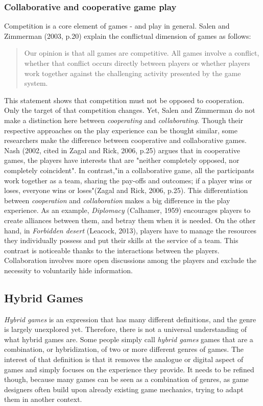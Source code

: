 \subsubsection{Collaborative and cooperative game play}
Competition is a core element of games - and play in general. Salen and Zimmerman (2003, p.20) explain the conflictual dimension of games as follows:
\begin{quotation}
Our opinion is that all games are competitive. All games involve a conflict, whether that conflict occurs directly between players or whether players work together against the challenging activity presented by the game system.
\end{quotation}
This statement shows that competition must not be opposed to cooperation. Only the target of that competition changes. Yet, Salen and Zimmerman do not make a distinction here between \textit{cooperating} and \textit{collaborating}. Though their respective approaches on the play experience can be thought similar, some researchers make the difference between cooperative and collaborative games. Nash (2002, cited in Zagal and Rick, 2006, p.25)\cite{art:collab} argues that in cooperative games, the players have interests that are "neither completely opposed, nor completely coincident". In contrast,"in a collaborative game, all the participants work together as a team, sharing the pay-offs and outcomes; if a player wins or loses, everyone wins or loses"(Zagal and Rick, 2006, p.25). This differentiation between \textit{cooperation} and \textit{collaboration} makes a big difference in the play experience. As an example, \textit{Diplomacy} (Calhamer, 1959)\cite{game:diplo} encourages players to create alliances between them, and betray them when it is needed. On the other hand, in \textit{Forbidden desert} (Leacock, 2013)\cite{game:desert}, players have to manage the resources they individually possess and put their skills at the service of a team. 
This contrast is noticeable thanks to the interactions between the players. Collaboration involves more open discussions among the players and exclude the necessity to voluntarily hide information.

\subsection{Hybrid Games}
\textit{Hybrid games} is an expression that has many different definitions, and the genre is largely unexplored yet. Therefore, there is not a universal understanding of what hybrid games are. Some people simply call \textit{hybrid games} games that are a combination, or hybridization, of two or more different genres of games. The interest of that definition is that it removes the analogue or digital aspect of games and simply focuses on the experience they provide. It needs to be refined though, because many games can be seen as a combination of genres, as game designers often build upon already existing game mechanics, trying to adapt them in another context.

